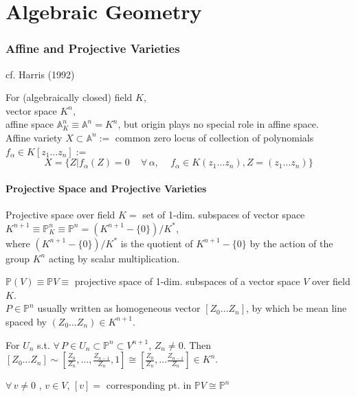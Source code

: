 \part{Algebraic Geometry}


\section{Affine and Projective Varieties}

cf. Harris (1992)\cite{agat:Har1992}

For (algebraically closed) field $K$,  \\
vector space $K^n$,  \\
affine space $\mathbb{A}^n_K \equiv \mathbb{A}^n = K^n$, but origin plays no special role in affine space. \\
Affine variety $X \subset \mathbb{A}^n := $ common zero locus of collection of polynomials $f_{\alpha} \in K [z_1 \dots z_n] :=$ 
\[
X = \lbrace Z | f_{\alpha}(Z) = 0 \quad \, \forall \, \alpha , \quad \, f_{\alpha} \in K(z_1 \dots z_n), Z = (z_1 \dots z_n) \rbrace 
\]

\subsection{Projective Space and Projective Varieties} 

Projective space over field $K = $ set of 1-dim. subspaces of vector space $K^{n+1} \equiv \mathbb{P}^n_K \equiv \mathbb{P}^n = (K^{n+1} - \lbrace 0 \rbrace ) / K^*$, \\
where $(K^{n+1} - \lbrace 0 \rbrace ) / K^*$ is the quotient of $K^{n+1} - \lbrace 0 \rbrace$ by the action of the group $K^n$ acting by scalar multiplication. 

$\mathbb{P}(V) \equiv \mathbb{P}V \equiv $ projective space of 1-dim. subspaces of a vector space $V$ over field $K$. \\
$P \in \mathbb{P}^n$ usually written as homogeneous vector $[Z_0 \dots Z_n]$, by which be mean line spaced by $(Z_0 \dots Z_n) \in K^{n+1}$. 

For $U_n$ s.t. $\forall \, P \in U_n \subset \mathbb{P}^n \subset V^{n+1}$, $Z_n \neq 0$.  Then $[Z_0 \dots Z_n] \sim \left[ \frac{ Z_0}{ Z_n} , \dots , \frac{Z_{n-1}}{Z_n} , 1 \right] \cong \left[ \frac{Z_0}{Z_n} , \dots \frac{Z_{n-1}}{ Z_n } \right] \in K^n$.  

$\forall \, v \neq 0$ , $v\in V$, $[v] = $ corresponding pt. in $\mathbb{P}V \cong \mathbb{P}^n$

